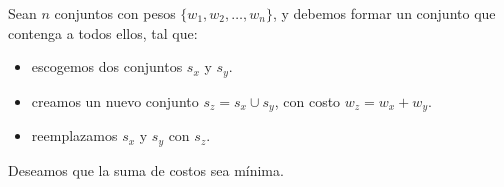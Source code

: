 \documentclass[12pt]{beamer}
\begin{document}
\begin{frame}
\begin{bloque}

Sean $n$ conjuntos con pesos $\{w_1, w_2, \dots, w_n\}$, y debemos formar un conjunto que contenga a todos ellos, tal que:

\begin{itemize}
    \item escogemos dos conjuntos $s_x$ y $s_y$.
    \item creamos un nuevo conjunto $s_z = s_x \cup s_y$, con costo $w_z = w_x + w_y$.
    \item reemplazamos $s_x$ y $s_y$ con $s_z$.
\end{itemize}

Deseamos que la suma de costos sea mínima.

\end{bloque}
\end{frame}
\end{document}
